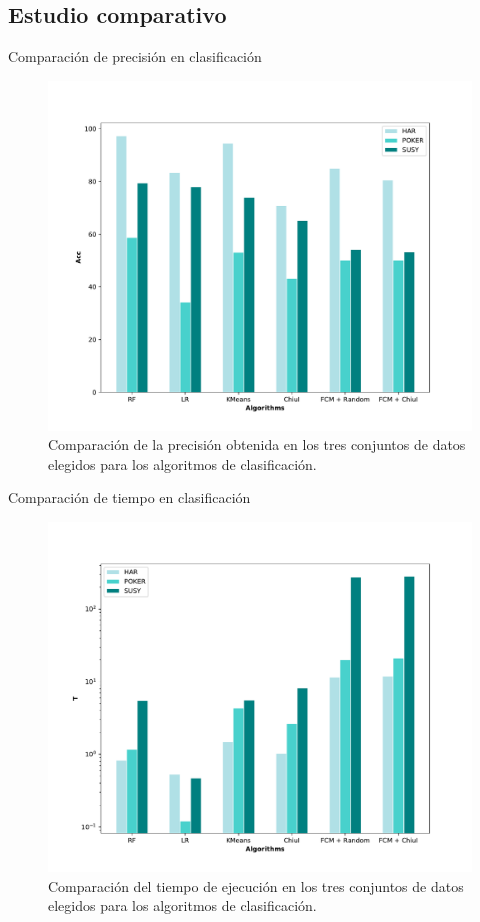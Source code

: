 \documentclass[10pt, spanish]{beamer}
\begin{document}
\subsection{Estudio comparativo}

\begin{frame}{Comparación de precisión en clasificación}
  \begin{figure}
	\centering
	\includegraphics[width=.75\textwidth]{img/acc-class}
	\caption{\footnotesize Comparación de la precisión obtenida en los tres conjuntos de datos elegidos para los algoritmos de clasificación.}
\end{figure}
\end{frame}

\begin{frame}{Comparación de tiempo en clasificación}
  \begin{figure}
	\centering
	\includegraphics[width=.75\textwidth]{img/time-class}
	\caption{\footnotesize Comparación del tiempo de ejecución en los tres conjuntos de datos elegidos para los algoritmos de clasificación.}
\end{figure}
\end{frame}
\end{document}
